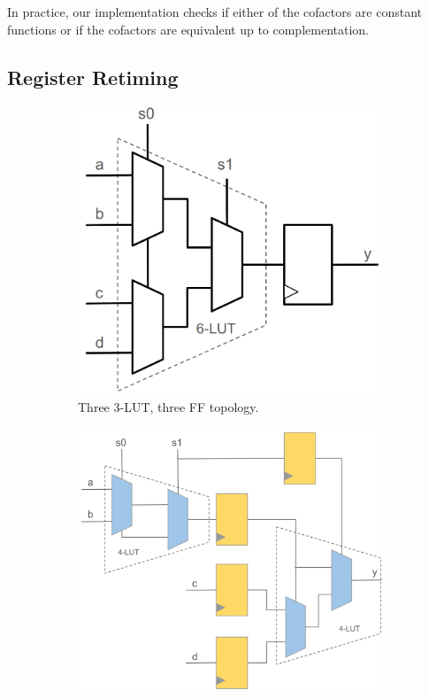 In practice, our implementation checks if either of the cofactors are constant
functions or if the cofactors are equivalent up to complementation.

\subsection{Register Retiming}\label{sec:rewrites:retiming}

\begin{figure}[tb]
    \begin{subfigure}{0.33\textwidth}
        \centering
        \includegraphics[width=\textwidth]{img/mux_4_1.png}
        \caption{Three 3-LUT, three FF topology.}\label{fig:retiming:a}
    \end{subfigure}
    \begin{subfigure}{0.33\textwidth}
        \centering
        \includegraphics[width=\textwidth]{img/mux_4_1_retime_dsd.png}

\end{subfigure}
\end{figure}
